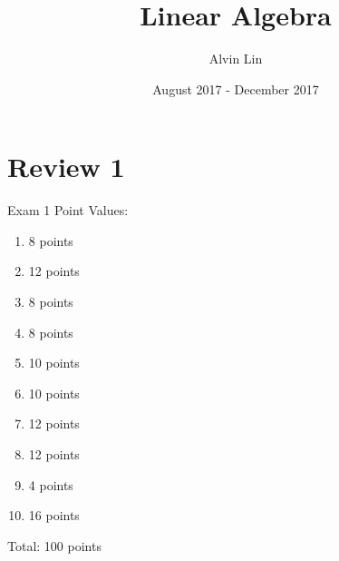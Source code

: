 \documentclass{math}
\title{Linear Algebra}
\author{Alvin Lin}
\date{August 2017 - December 2017}
\begin{document}
\maketitle

\section*{Review 1}
Exam 1 Point Values:
\begin{enumerate}
  \item 8 points
  \item 12 points
  \item 8 points
  \item 8 points
  \item 10 points
  \item 10 points
  \item 12 points
  \item 12 points
  \item 4 points
  \item 16 points
\end{enumerate}
Total: 100 points \\ \\
\end{document}
